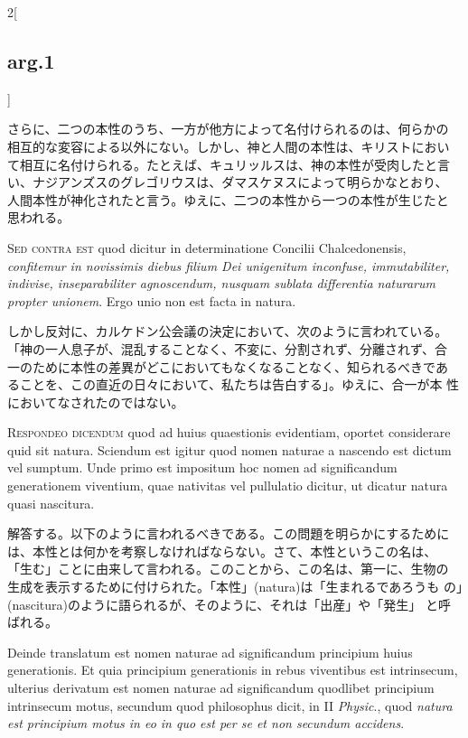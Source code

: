 \documentclass[paper=a4paper,fontsize=10pt,jafontsize=9pt,titlepage]{jlreq}
\begin{document}
\begin{paracol}{2}[\subsection{arg.1}]
\switchcolumn

さらに、二つの本性のうち、一方が他方によって名付けられるのは、何らかの
相互的な変容による以外にない。しかし、神と人間の本性は、キリストにおい
て相互に名付けられる。たとえば、キュリッルスは、神の本性が受肉したと言
い、ナジアンズスのグレゴリウスは、ダマスケヌスによって明らかなとおり、
人間本性が神化されたと言う。ゆえに、二つの本性から一つの本性が生じたと
思われる。

\switchcolumn*[\subsection{s.c.}]

{\scshape Sed contra est} quod dicitur in determinatione Concilii
Chalcedonensis, {\itshape confitemur in novissimis diebus filium Dei
unigenitum inconfuse, immutabiliter, indivise, inseparabiliter
agnoscendum, nusquam sublata differentia naturarum propter
unionem}. Ergo unio non est facta in natura.

\switchcolumn

しかし反対に、カルケドン公会議の決定において、次のように言われている。
「神の一人息子が、混乱することなく、不変に、分割されず、分離されず、合
一のために本性の差異がどこにおいてもなくなることなく、知られるべきであ
ることを、この直近の日々において、私たちは告白する」。ゆえに、合一が本
性においてなされたのではない。


{\scshape Respondeo dicendum} quod ad huius quaestionis evidentiam,
oportet considerare quid sit natura. Sciendum est igitur quod nomen
naturae a nascendo est dictum vel sumptum. Unde primo est impositum
hoc nomen ad significandum generationem viventium, quae nativitas vel
pullulatio dicitur, ut dicatur natura quasi nascitura.

\switchcolumn

解答する。以下のように言われるべきである。この問題を明らかにするために
は、本性とは何かを考察しなければならない。さて、本性というこの名は、
「生む」ことに由来して言われる。このことから、この名は、第一に、生物の
生成を表示するために付けられた。「本性」(natura)は「生まれるであろうも
の」(nascitura)のように語られるが、そのように、それは「出産」や「発生」
と呼ばれる。

\switchcolumn*

Deinde translatum est nomen naturae ad significandum principium huius
generationis. Et quia principium generationis in rebus viventibus est
intrinsecum, ulterius derivatum est nomen naturae ad significandum
quodlibet principium intrinsecum motus, secundum quod philosophus
dicit, in II {\itshape Physic}., quod {\itshape natura est principium
motus in eo in quo est per se et non secundum accidens}.


\end{paracol}
\end{document}
